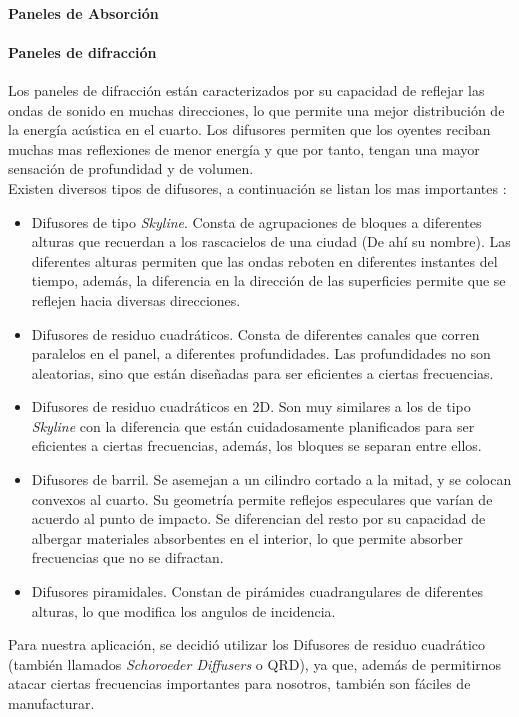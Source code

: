 \paragraph{Paneles de Absorción}

\paragraph{Paneles de difracción}
Los paneles de difracción están caracterizados por su capacidad de reflejar las ondas de sonido en muchas direcciones, lo que permite una mejor distribución de la energía acústica en el cuarto. Los difusores permiten que los oyentes reciban muchas mas reflexiones de menor energía y que por tanto, tengan una mayor sensación de profundidad y de volumen. \cite{PilchDiffusers}\\
Existen diversos tipos de difusores, a continuación se listan los mas importantes \cite{TypesDiffusers}:
\begin{itemize}
    \item Difusores de tipo \textit{Skyline}. Consta de agrupaciones de bloques a diferentes alturas que recuerdan a los rascacielos de una ciudad (De ahí su nombre). Las diferentes alturas permiten que las ondas reboten en diferentes instantes del tiempo, además, la diferencia en la dirección de las superficies permite que se reflejen hacia diversas direcciones.
    \item Difusores de residuo cuadráticos. Consta de diferentes canales que corren paralelos en el panel, a diferentes profundidades. Las profundidades no son aleatorias, sino que están diseñadas para ser eficientes a ciertas frecuencias.
    \item Difusores de residuo cuadráticos en 2D. Son muy similares a los de tipo \textit{Skyline} con la diferencia que están cuidadosamente planificados para ser eficientes a ciertas frecuencias, además, los bloques se separan entre ellos.
    \item Difusores de barril. Se asemejan a un cilindro cortado a la mitad, y se colocan convexos al cuarto. Su geometría permite reflejos especulares que varían de acuerdo al punto de impacto. Se diferencian del resto por su capacidad de albergar materiales absorbentes en el interior, lo que permite absorber frecuencias que no se difractan. 
    \item Difusores piramidales. Constan de pirámides cuadrangulares de diferentes alturas, lo que modifica los angulos de incidencia.
\end{itemize}
Para nuestra aplicación, se decidió utilizar los Difusores de residuo cuadrático (también llamados \textit{Schoroeder Diffusers} o QRD), ya que, además de permitirnos atacar ciertas frecuencias importantes para nosotros, también son fáciles de manufacturar. 
